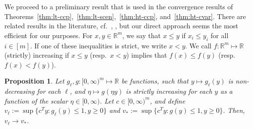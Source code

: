 \documentclass[a4paper, a4wide, 10pt, reqno]{amsart}
\theoremstyle{plain}
\newtheorem{proposition}{Proposition}
\begin{document}
\medskip
We proceed to a preliminary result that is used in the convergence results of Theorems~\ref{thm:lt-ccp},~\ref{thm:lt-scen},~\ref{thm:ht-ccp}, and~\ref{thm:ht-cvar}. 
There are related results in the literature, cf.\  \cite{Bonnans}, \cite{RockWets98}, but our direct approach seems the most efficient for our purposes. 
For $x,y\in\mathbb{R}^m$, we say that $x\le y$ if $x_i\le y_i$ for all $i\in [m]$. If one of these inequalities is strict, we write $x<y$. We call $f:\mathbb{R}^m\mapsto\mathbb{R}$ (strictly) increasing if $x\le y$ (resp.\ $x<y$) implies that $f(x)\le f(y)$ (resp.\ $f(x)<f(y)$).

\begin{proposition}\label{prop:1}
    Let $g_\ell, g: [0,\infty)^m\mapsto \mathbb{R}$ be functions, such that $y\mapsto g_\ell( y)$ is non-decreasing for each $\ell$, and $\eta\mapsto g(\eta y)$ is strictly increasing for each $y$ as a function of the scalar $\eta\in [0,\infty)$. Let $c\in[0,\infty)^m$, and define $v_\ell:=\sup \{c^Ty: g_\ell(y)\le 1, y\ge 0\}$ and $v_\ast := \sup \{c^Ty: g(y)\le 1, y\ge 0\}$. Then, $v_\ell\to v_\ast$.
\end{proposition}
\end{document}
